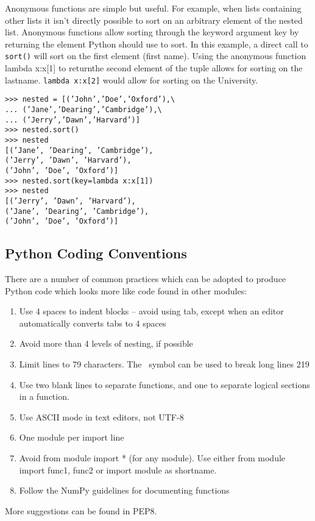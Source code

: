 \documentclass[KSmain.tex]{subfiles}
\begin{document}
Anonymous functions are simple but useful. For example, when lists containing other lists it isn’t
directly possible to sort on an arbitrary element of the nested list. Anonymous functions allow sorting
through the keyword argument key by returning the element Python should use to sort. In this example,
a direct call to \texttt{sort()} will sort on the first element (first name). Using the anonymous function
lambda x:x[1] to returnthe second element of the tuple allows for sorting on the lastname. \texttt{lambda x:x[2]}
would allow for sorting on the University.
\begin{framed}
	\begin{verbatim}
>>> nested = [(’John’,’Doe’,’Oxford’),\
... (’Jane’,’Dearing’,’Cambridge’),\
... (’Jerry’,’Dawn’,’Harvard’)]
>>> nested.sort()
>>> nested
[(’Jane’, ’Dearing’, ’Cambridge’),
(’Jerry’, ’Dawn’, ’Harvard’),
(’John’, ’Doe’, ’Oxford’)]
>>> nested.sort(key=lambda x:x[1])
>>> nested
[(’Jerry’, ’Dawn’, ’Harvard’),
(’Jane’, ’Dearing’, ’Cambridge’),
(’John’, ’Doe’, ’Oxford’)]
\end{verbatim}
\end{framed}
\subsection{Python Coding Conventions}
There are a number of common practices which can be adopted to produce Python code which looks
more like code found in other modules:
\begin{enumerate}
\item Use 4 spaces to indent blocks – avoid using tab, except when an editor automatically converts tabs
to 4 spaces
\item Avoid more than 4 levels of nesting, if possible
\item Limit lines to 79 characters. The \ symbol can be used to break long lines
219
\item Use two blank lines to separate functions, and one to separate logical sections in a function.
\item Use ASCII mode in text editors, not UTF-8
\item One module per import line
\item Avoid from module import * (for any module). Use either from module import func1, func2 or
import module as shortname.
\item Follow the NumPy guidelines for documenting functions
\end{enumerate}

More suggestions can be found in PEP8.
\end{document}
